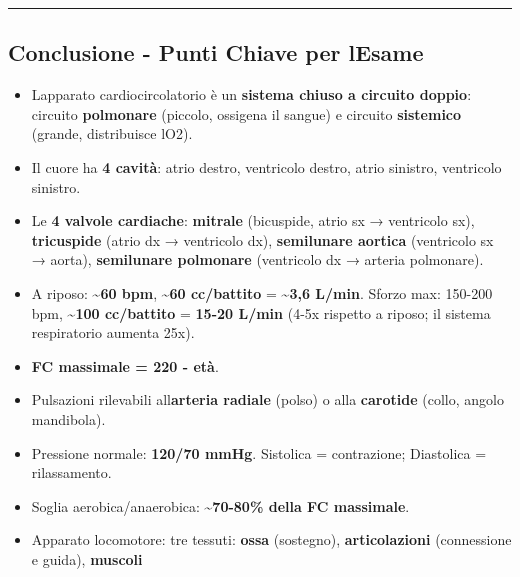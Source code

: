 \documentclass[a4paper,11pt]{article}
\providecommand{\tightlist}{%
  \setlength{\itemsep}{0pt}\setlength{\parskip}{0pt}}
\begin{document}
\begin{center}\rule{0.5\linewidth}{0.5pt}\end{center}

\subsection{Conclusione - Punti Chiave per
      l\textquotesingle Esame}\label{conclusione---punti-chiave-per-lesame-2}

\begin{itemize}
      \tightlist
      \item
            L\textquotesingle apparato cardiocircolatorio è un \textbf{sistema
                  chiuso a circuito doppio}: circuito \textbf{polmonare} (piccolo,
            ossigena il sangue) e circuito \textbf{sistemico} (grande,
            distribuisce l\textquotesingle O2).
      \item
            Il cuore ha \textbf{4 cavità}: atrio destro, ventricolo destro, atrio
            sinistro, ventricolo sinistro.
      \item
            Le \textbf{4 valvole cardiache}: \textbf{mitrale} (bicuspide, atrio sx
            → ventricolo sx), \textbf{tricuspide} (atrio dx → ventricolo dx),
            \textbf{semilunare aortica} (ventricolo sx → aorta),
            \textbf{semilunare polmonare} (ventricolo dx → arteria polmonare).
      \item
            A riposo: \textasciitilde{}\textbf{60 bpm},
            \textasciitilde{}\textbf{60 cc/battito} = \textasciitilde{}\textbf{3,6
                  L/min}. Sforzo max: 150-200 bpm, \textasciitilde{}\textbf{100
                  cc/battito} = \textbf{15-20 L/min} (4-5x rispetto a riposo; il sistema
            respiratorio aumenta 25x).
      \item
            \textbf{FC massimale = 220 - età}.
      \item
            Pulsazioni rilevabili all\textquotesingle{}\textbf{arteria radiale}
            (polso) o alla \textbf{carotide} (collo, angolo mandibola).
      \item
            Pressione normale: \textbf{120/70 mmHg}. Sistolica = contrazione;
            Diastolica = rilassamento.
      \item
            Soglia aerobica/anaerobica: \textasciitilde{}\textbf{70-80\% della FC
                  massimale}.
      \item
            Apparato locomotore: tre tessuti: \textbf{ossa} (sostegno),
            \textbf{articolazioni} (connessione e guida), \textbf{muscoli}

\end{itemize}
\end{document}
